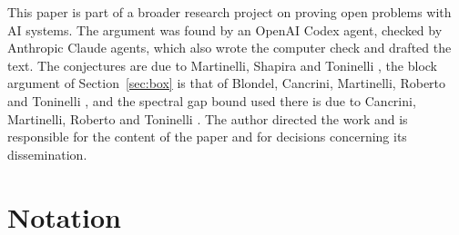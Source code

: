 \documentclass[11pt]{amsart}
\theoremstyle{definition}
\theoremstyle{remark}
\begin{document}
This paper is part of a broader research project on proving open problems with AI systems. The argument was found by an
OpenAI Codex agent, checked by Anthropic Claude agents, which also wrote the computer check and drafted the text. The
conjectures are due to Martinelli, Shapira and Toninelli \cite{MST25}, the block argument of Section~\ref{sec:box} is that
of Blondel, Cancrini, Martinelli, Roberto and Toninelli \cite{BCMRT13}, and the spectral gap bound used there is due to
Cancrini, Martinelli, Roberto and Toninelli \cite{CMRT09}. The author directed the work and is responsible for the content
of the paper and for decisions concerning its dissemination.

\appendix
\section{Notation}\label{app:notation}
\end{document}
